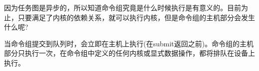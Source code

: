 因为任务图是异步的，所以知道命令组究竟是什么时候执行是有意义的。目前为止，只要满足了内核的依赖关系，就可以执行内核，但是命令组的主机部分会发生什么呢?\par

当命令组提交到队列时，会立即在主机上执行(在submit返回之前)。命令组的主机部分只执行一次，在命令组中定义的任何内核或显式数据操作，都将排队在设备上执行。\par

































